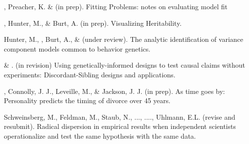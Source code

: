 \item \meb, Preacher, K. \& \joe(in prep). Fitting Problems: notes on evaluating model fit

\item \meb, Hunter, M., \& Burt, A. (in prep). Visualizing Heritability.

\item Hunter, M., \meb, Burt, A., \& \joe (under review). The analytic identification of variance component models common to behavior genetics.

\item \meb \& \joe. (in revision) Using genetically-informed designs to test causal claims without experiments: Discordant-Sibling designs and applications. \href{https://osf.io/zpdwt/}{\small\color{blue}{osf.io/zpdwt/}}%

\item\meb, Connolly, J. J., Leveille, M., \& Jackson, J. J. (in prep). As time goes by: Personality predicts the timing of divorce over 45 years.%

\item Schweinsberg, M., Feldman, M., Staub, N., ..., \meb ...., Uhlmann, E.L. (revise and resubmit). Radical dispersion in empirical results when independent scientists operationalize and test the same hypothesis with the same data. %

\vspace{-2mm}\begin{center}\end{center} \vspace{-4mm}
